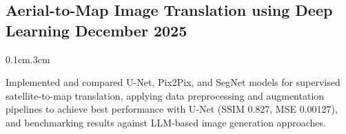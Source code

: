 \subsection{{Aerial-to-Map Image Translation using Deep Learning \hfill December 2025}}

\begin{adjustwidth}{0.1cm}{.3cm}
\begin{zitemize}

\item \begin{justify}
Implemented and compared U-Net, Pix2Pix, and SegNet models for supervised satellite-to-map translation, applying data preprocessing and augmentation pipelines to achieve best performance with U-Net (SSIM 0.827, MSE 0.00127), and benchmarking results against LLM-based image generation approaches.
\end{justify}

\end{zitemize}
\end{adjustwidth}
\vspace{.70em}
\vspace{-.25em}
